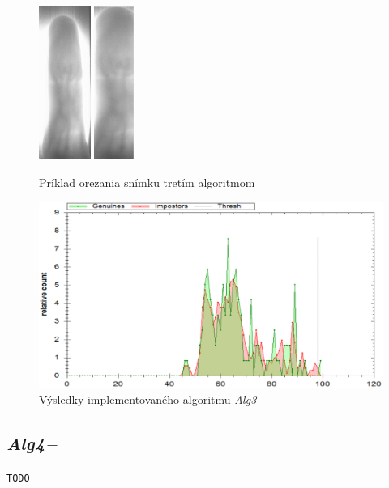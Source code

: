 \documentclass[11pt,a4paper]{article}
\begin{document}
\vfill
\begin{figure}[ht!]
	\centering
	\includegraphics[height=5cm]{fig/alg3_in.eps}
	\includegraphics[height=5cm]{fig/alg3_out.eps}
	\caption{\label{fig:alg_out} Príklad orezania snímku tretím algoritmom}
\end{figure}

\vfill

\begin{figure}[ht!]
	\centering
	\includegraphics[width=12cm]{fig/alg3.eps}
	\caption{\label{fig:alg3} Výsledky implementovaného algoritmu \emph{Alg3}}
\end{figure}
\vfill

\clearpage
\subsection{\emph{Alg4}\,--\,} \label{alg4}
\texttt{TODO}
\lipsum[1-32]
\end{document}

